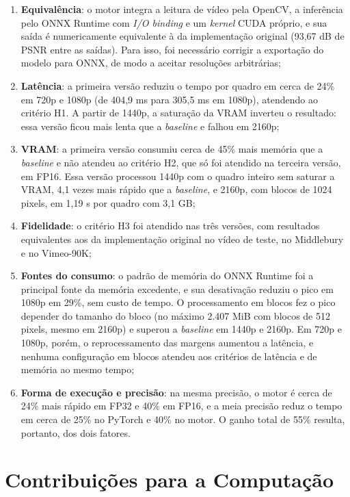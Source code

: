 \documentclass[
    12pt,                %
    openright,           %
    oneside,             %
    a4paper,             %
    english,             %
    brazil               %
]{abntex2}
\begin{document}
\begin{enumerate}
    \item \textbf{Equivalência}: o motor integra a leitura de vídeo pela OpenCV, a inferência pelo ONNX Runtime com \textit{I/O binding} e um \textit{kernel} CUDA próprio, e sua saída é numericamente equivalente à da implementação original (93,67 dB de PSNR entre as saídas). Para isso, foi necessário corrigir a exportação do modelo para ONNX, de modo a aceitar resoluções arbitrárias;
    \item \textbf{Latência}: a primeira versão reduziu o tempo por quadro em cerca de 24\% em 720p e 1080p (de 404,9 ms para 305,5 ms em 1080p), atendendo ao critério H1. A partir de 1440p, a saturação da VRAM inverteu o resultado: essa versão ficou mais lenta que a \textit{baseline} e falhou em 2160p;
    \item \textbf{VRAM}: a primeira versão consumiu cerca de 45\% mais memória que a \textit{baseline} e não atendeu ao critério H2, que só foi atendido na terceira versão, em FP16. Essa versão processou 1440p com o quadro inteiro sem saturar a VRAM, 4,1 vezes mais rápido que a \textit{baseline}, e 2160p, com blocos de 1024 pixels, em 1,19 s por quadro com 3,1 GB;
    \item \textbf{Fidelidade}: o critério H3 foi atendido nas três versões, com resultados equivalentes aos da implementação original no vídeo de teste, no Middlebury e no Vimeo-90K;
    \item \textbf{Fontes do consumo}: o padrão de memória do ONNX Runtime foi a principal fonte da memória excedente, e sua desativação reduziu o pico em 1080p em 29\%, sem custo de tempo. O processamento em blocos fez o pico depender do tamanho do bloco (no máximo 2.407 MiB com blocos de 512 pixels, mesmo em 2160p) e superou a \textit{baseline} em 1440p e 2160p. Em 720p e 1080p, porém, o reprocessamento das margens aumentou a latência, e nenhuma configuração em blocos atendeu aos critérios de latência e de memória ao mesmo tempo;
    \item \textbf{Forma de execução e precisão}: na mesma precisão, o motor é cerca de 24\% mais rápido em FP32 e 40\% em FP16, e a meia precisão reduz o tempo em cerca de 25\% no PyTorch e 40\% no motor. O ganho total de 55\% resulta, portanto, dos dois fatores.
\end{enumerate}

\section{Contribuições para a Computação}
\label{sec:contribuicoes}
\end{document}
